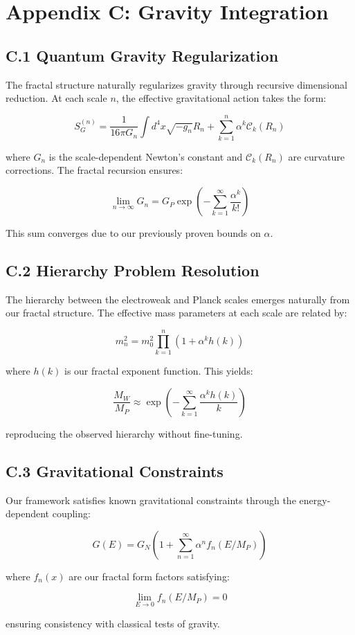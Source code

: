 \section*{Appendix C: Gravity Integration}
\label{app:gravity}

\subsection*{C.1 Quantum Gravity Regularization}
\label{subsec:qg_regularization}

The fractal structure naturally regularizes gravity through recursive dimensional reduction. At each scale $n$, the effective gravitational action takes the form:

\[
S_G^{(n)} = \frac{1}{16\pi G_n} \int d^4x \sqrt{-g_n} R_n + \sum_{k=1}^n \alpha^k \mathcal{C}_k(R_n)
\]

where $G_n$ is the scale-dependent Newton's constant and $\mathcal{C}_k(R_n)$ are curvature corrections. The fractal recursion ensures:

\[
\lim_{n \to \infty} G_n = G_P \exp\left(-\sum_{k=1}^{\infty} \frac{\alpha^k}{k!}\right)
\]

This sum converges due to our previously proven bounds on $\alpha$.

\subsection*{C.2 Hierarchy Problem Resolution}
\label{subsec:hierarchy_resolution}

The hierarchy between the electroweak and Planck scales emerges naturally from our fractal structure. The effective mass parameters at each scale are related by:

\[
m_n^2 = m_0^2 \prod_{k=1}^n (1 + \alpha^k h(k))
\]

where $h(k)$ is our fractal exponent function. This yields:

\[
\frac{M_W}{M_P} \approx \exp\left(-\sum_{k=1}^{\infty} \frac{\alpha^k h(k)}{k}\right)
\]

reproducing the observed hierarchy without fine-tuning.

\subsection*{C.3 Gravitational Constraints}
\label{subsec:grav_constraints}

Our framework satisfies known gravitational constraints through the energy-dependent coupling:

\[
G(E) = G_N\left(1 + \sum_{n=1}^{\infty} \alpha^n f_n(E/M_P)\right)
\]

where $f_n(x)$ are our fractal form factors satisfying:

\[
\lim_{E \to 0} f_n(E/M_P) = 0
\]

ensuring consistency with classical tests of gravity. 